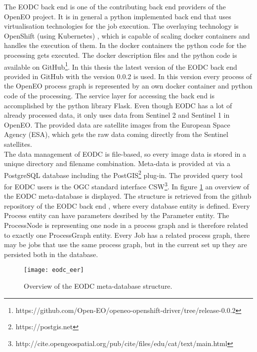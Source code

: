 \documentclass[draft,final]{vutinfth} %
\begin{document}
 The EODC back end is one of the contributing back end providers of the OpenEO project. It is in general a python implemented back end that uses virtualisation technologies for the job execution. The overlaying technology is OpenShift (using Kubernetes) \cite{openshift}, which is capable of scaling docker containers and handles the execution of them. In the docker containers the python code for the processing gets executed. The docker description files and the python code is available on GitHub\footnote{https://github.com/Open-EO/openeo-openshift-driver/tree/release-0.0.2}. In this thesis the latest version of the EODC back end provided in GitHub with the version 0.0.2 is used. In this version every process of the OpenEO process graph is represented by an own docker container and python code of the processing. The service layer for accessing the back end is accomplished by the python library Flask. Even though EODC has a lot of already processed data, it only uses data from Sentinel 2 and Sentinel 1 in OpenEO. The provided data are satellite images from the European Space Agency (ESA), which gets the raw data coming directly from the Sentinel satellites. \\
 The data management of EODC is file-based, so every image data is stored in a unique directory and filename combination. Meta-data is provided at via a PostgreSQL database including the PostGIS\footnote{https://postgis.net} plug-in. The provided query tool for EODC users is the OGC standard interface CSW\footnote{http://cite.opengeospatial.org/pub/cite/files/edu/cat/text/main.html}. In figure \ref{fig:eodceer} an overview of the EODC meta-database is displayed. The structure is retrieved from the github repository of the EODC back end \cite{eodc_github}, where every database entity is defined. Every Process entity can have parameters desribed by the Parameter entity. The ProcessNode is representing one node in a process graph and is therefore related to exactly one ProcessGraph entity. Every Job has a related process graph, there may be jobs that use the same process graph, but in the current set up they are persisted both in the database.
 \begin{figure}[h]
 	\centering
 	\texttt{[image: eodc\_eer]}
 	\caption{Overview of the EODC meta-database structure.}
 	\label{fig:eodceer} %
 \end{figure}
 
\end{document}
